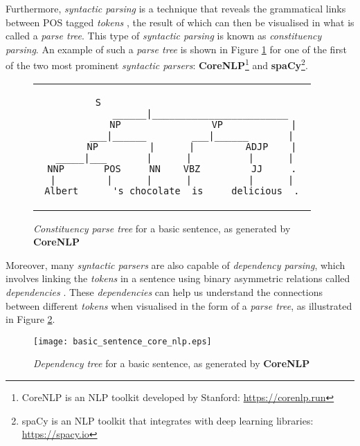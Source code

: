 Furthermore, \textit{syntactic parsing} is a technique that reveals the grammatical links between POS tagged \textit{tokens} \cite{noauthor_syntactic_nodate}, the result of which can then be visualised in what is called a \textit{parse tree}. This type of \textit{syntactic parsing} is known as \textit{constituency parsing}. An example of such a \textit{parse tree} is shown in Figure \ref{fig:constituency_tree_basic_sentence} for one of the first of the two most prominent \textit{syntactic parsers}: \textbf{CoreNLP}\footnote{CoreNLP is an NLP toolkit developed by Stanford: \url{https://corenlp.run}} and \textbf{spaCy}\footnote{spaCy is an NLP toolkit that integrates with deep learning libraries: \url{https://spacy.io}}.

\begin{figure}[H]
\centering
\begin{tabular}{c}
\begin{lstlisting}[numbers=none, basicstyle=\ttfamily, columns=fixed]
                   S                          
             ______|________________________   
            NP                VP            | 
         ___|______        ___|______       |  
        NP         |      |         ADJP    | 
   _____|___       |      |          |      |  
 NNP       POS     NN    VBZ         JJ     . 
  |         |      |      |          |      |  
Albert      's chocolate  is     delicious  .
\end{lstlisting}
\end{tabular}
\caption{\textit{Constituency parse tree} for a basic sentence, as generated by  \textbf{CoreNLP}}
\label{fig:constituency_tree_basic_sentence}
\end{figure}

\noindent
Moreover, many \textit{syntactic parsers} are also capable of \textit{dependency parsing}, which involves linking the \textit{tokens} in a sentence using binary asymmetric relations called \textit{dependencies} \cite{kubler_dependency_nodate}. These \textit{dependencies} can help us understand the connections between different \textit{tokens} when visualised in the form of a \textit{parse tree}, as illustrated in Figure \ref{fig:dependency_tree_basic_sentence}.

\begin{figure}[H]
\centering
\texttt{[image: basic\_sentence\_core\_nlp.eps]}
\caption{\textit{Dependency tree} for a basic sentence, as generated by  \textbf{CoreNLP}}
\label{fig:dependency_tree_basic_sentence}
\end{figure}


